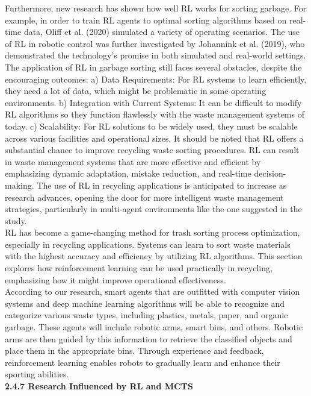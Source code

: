 \documentclass[a4paper,11pt,onecolumn]{article}
\begin{document}
Furthermore, new research has shown how well RL works for sorting garbage. For example, in order to train RL agents to optimal sorting algorithms based on real-time data, Oliff et al. (2020) simulated a variety of operating scenarios. The use of RL in robotic control was further investigated by Johannink et al. (2019), who demonstrated the technology's promise in both simulated and real-world settings.\\
The application of RL in garbage sorting still faces several obstacles, despite the encouraging outcomes: a) Data Requirements: For RL systems to learn efficiently, they need a lot of data, which might be problematic in some operating environments. b) Integration with Current Systems: It can be difficult to modify RL algorithms so they function flawlessly with the waste management systems of today. c) Scalability: For RL solutions to be widely used, they must be scalable across various facilities and operational sizes. It should be noted that RL offers a substantial chance to improve recycling waste sorting procedures.  RL can result in waste management systems that are more effective and efficient by emphasizing dynamic adaptation, mistake reduction, and real-time decision-making. The use of RL in recycling applications is anticipated to increase as research advances, opening the door for more intelligent waste management strategies, particularly in multi-agent environments like the one suggested in the study.\\
RL has become a game-changing method for trash sorting process optimization, especially in recycling applications. Systems can learn to sort waste materials with the highest accuracy and efficiency by utilizing RL algorithms. This section explores how reinforcement learning can be used practically in recycling, emphasizing how it might improve operational effectiveness.\\
According to our research, smart agents that are outfitted with computer vision systems and deep machine learning algorithms will be able to recognize and categorize various waste types, including plastics, metals, paper, and organic garbage. These agents will include robotic arms, smart bins, and others. Robotic arms are then guided by this information to retrieve the classified objects and place them in the appropriate bins. Through experience and feedback, reinforcement learning enables robots to gradually learn and enhance their sporting abilities. \newline \\
\textbf{2.4.7 Research Influenced by RL and MCTS}\\
\end{document}
